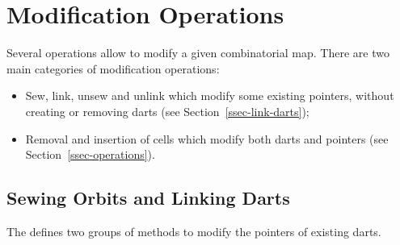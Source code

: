 \section{Modification Operations}

Several operations allow to modify a given combinatorial map.
There are two main categories of modification operations:
\begin{itemize}
\item Sew, link, unsew and unlink which modify some existing \betats{}
  pointers, without creating or removing darts (see
  Section~\ref{ssec-link-darts});
\item Removal and insertion of cells which modify both darts and
  \betats{} pointers (see Section~\ref{ssec-operations}).
\end{itemize}
%

\subsection{Sewing Orbits and Linking Darts \label{ssec-link-darts}}

The  defines two groups of methods to modify the
\betats{} pointers of existing darts.


